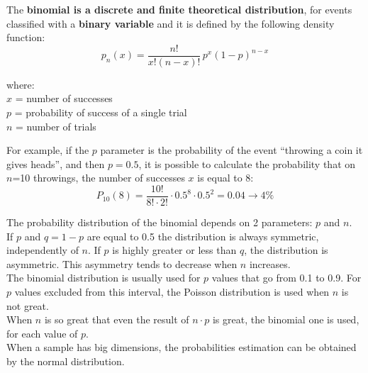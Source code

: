 
\begin{frame}
  \vspace*{.3cm}
  The \textbf{binomial is a discrete and finite theoretical distribution}, for events classified with a \textbf{binary variable} and it is defined by the following density function:\\
  \vspace*{.3cm}
  $$ p_n(x) = \frac{n!}{x!(n-x)!} \, p^x(1-p)^{n-x} $$
  \begin{tabbing}
    where: \hspace*{.25cm} \= \\
    \hspace*{.1cm} \> $ x $ = number of successes \\
    \hspace*{.1cm} \> $ p $ = probability of success of a single trial \\
    \hspace*{.1cm} \> $ n $ = number of trials
  \end{tabbing}
\end{frame}

\begin{frame}
  \vspace*{.5cm}
  For example, if the {\boldmath $ p $} parameter is the probability of the event ``throwing a coin it gives heads'', and then $ p = 0.5 $, it is possible to calculate the probability that on {\boldmath $ n $}=10 throwings, the number of successes {\boldmath $ x $} is equal to 8:\\
  \vspace*{.5cm}
  $$ P_{10}(8) = \frac{10!}{8!\cdot 2!}\cdot 0.5^8 \cdot 0.5^2 = 0.04 \rightarrow 4 \% $$  
\end{frame}

\begin{frame}
  The probability distribution of the binomial depends on 2 parameters: {\boldmath $ p $} and {\boldmath $ n $}.\\
  \vspace*{.2cm}
  If $ p $ and {\boldmath $ q = 1-p $} are equal to 0.5 the distribution is always symmetric, independently of $ n $. If $ p $ is highly greater or less than $ q $, the distribution is asymmetric. This asymmetry tends to decrease when $ n $ increases.\\
  \vspace*{.2cm}
  The binomial distribution is usually used for $ p $ values that go from 0.1 to 0.9. For $ p $ values excluded from this interval, the Poisson distribution is used when $ n $ is not great.\\
  \vspace*{.2cm}
  When $ n $ is so great that even the result of {\boldmath$n \cdot p$} is great, the binomial one is used, for each value of $ p $.\\
  \vspace*{.2cm}
  When a sample has big dimensions, the probabilities estimation can be obtained by the normal distribution.
\end{frame}

